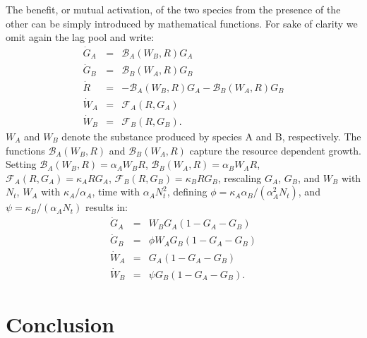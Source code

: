 \documentclass[10pt,A4paper]{article}
\begin{document}
The benefit, or mutual activation, of the two species from the presence of the other can be simply introduced by mathematical functions. 
For sake of clarity we omit again the lag pool and write:
\begin{eqnarray}
\dot{G}_A &=& \mathcal{B}_A(W_B,R)G_A\\
\dot{G}_B &=& \mathcal{B}_B(W_A,R)G_B\\
\dot{R} &=&-\mathcal{B}_A(W_B,R)G_A-\mathcal{B}_B(W_A,R)G_B\\
\dot{W}_A &=& \mathcal{F}_A(R,G_A)\\
\dot{W}_B &=& \mathcal{F}_B(R,G_B).
\end{eqnarray}
$W_A$ and $W_B$ denote the substance produced by species A and B, respectively. The functions $\mathcal{B}_A(W_B,R)$ and $\mathcal{B}_B(W_A,R)$ capture the resource dependent growth. Setting $\mathcal{B}_A(W_B,R)=\alpha_A W_BR$, $\mathcal{B}_B(W_A,R)=\alpha_B W_AR$, $\mathcal{F}_A(R,G_A)=\kappa_A RG_A$, $\mathcal{F}_B(R,G_B)=\kappa_B RG_B$, rescaling $G_A$, $G_B$, and $W_B$ with $N_t$, $W_A$ with $\kappa_A/\alpha_A$, time with $\alpha_AN_t^2$, defining $\phi=\kappa_A\alpha_B/(\alpha_A^2N_t)$, and $\psi=\kappa_B/(\alpha_A N_t)$ results in: 
\begin{eqnarray}
\dot{G}_A &=& W_BG_A\left(1 - G_A-G_B\right )\\
\dot{G}_B &=& \phi W_AG_B\left(1 - G_A-G_B\right )\\
\dot{W}_A &=& G_A\left(1 - G_A-G_B\right )\\
\dot{W}_B &=&\psi G_B\left(1 - G_A-G_B\right ).
\end{eqnarray}



\section{Conclusion}


\end{document}
